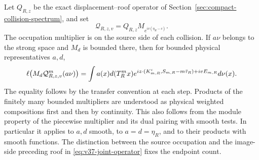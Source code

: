 Let $Q_{R,z}$ be the exact displacement--roof operator of
Section~\ref{sec:compact-collision-spectrum}, and set
\begin{equation}\label{eq:v37-joint-operator}
 \mathcal Q_{R,z,v}=Q_{R,z}M_{e^{iv(\eta_R-c)}}.
\end{equation}
The occupation multiplier is on the source side of each collision.
If $a\nu$ belongs to the strong space and $M_d$ is bounded there,
then for bounded physical representatives $a,d$,
\begin{align}\label{eq:v37-exact-joint-pairing}
 \ell\bigl(M_d\mathcal Q_{R,z,v}^{m}(a\nu)\bigr)
  =\int a(x)d(T_R^mx)
   e^{iz\cdot(K^{\rm c}_{m,R},S_{m,R}-m\bar\tau_R)+ivE_{m,R}}d\nu(x).
\end{align}
The equality follows by the transfer convention at each step. Products
of the finitely many bounded multipliers are understood as physical
weighted compositions first and then by continuity. This also follows
from the module property of the piecewise multiplier and its dual
pairing with smooth tests. In particular it applies to $a,d$ smooth,
to $a=d=\eta_R$, and to their products with smooth functions.
The distinction between the source occupation and the image-side
preceding roof in \eqref{eq:v37-joint-operator} fixes the endpoint count.

